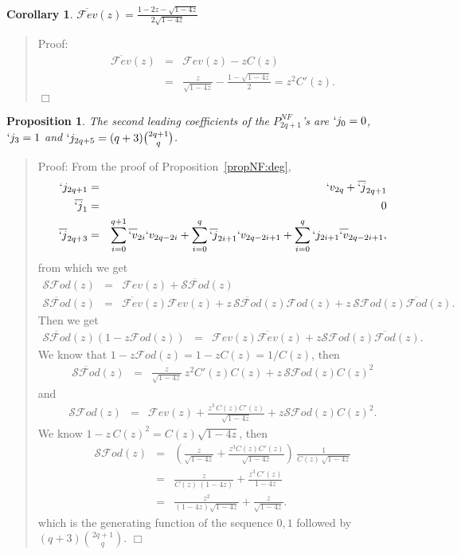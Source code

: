 \documentclass[preprint,authoryear]{elsarticle}
\newenvironment{proof}[1]{\begin{quotation}\noindent\textsf{Proof:} #1}{\(\Box\)\end{quotation}}
\newtheorem{prop}{Proposition}
\newtheorem{corollary}{Corollary}
\newcommand{\Fev}{\mathcal{F}ev}
\newcommand{\Fevb}{\overline{\mathcal{F}ev}}
\newcommand{\Fod}{\mathcal{F}od}
\newcommand{\Fodb}{\overline{\mathcal{F}od}}
\newcommand{\SFod}{\mathcal{SF}od}
\newcommand{\SFodb}{\overline{\mathcal{SF}od}}
\newcommand{\phib}[1]{\overline{`v}_{#1}}
\newcommand{\psib}[1]{\overline{`j}_{#1}}
\begin{document}
  \begin{corollary}
    $\Fevb(z) = \frac{1-2z - \sqrt{1-4z}}{2\sqrt{1-4z}}$
  \end{corollary}
  \begin{proof}{} 
    \begin{eqnarray*}
      \Fevb(z) &=& \Fev(z) - z C(z)\\
      &=& \frac{z}{\sqrt{1-4z}} - \frac{1-\sqrt{1-4z}}{2} =  z^2 C'(z).
    \end{eqnarray*}
  \end{proof}
 \begin{prop}
The second leading coefficients of  the $P^{NF}_{2q+1}$'s are $`j_0=0$, ${`j_3=1}$ and
$`j_{2q+5} = (q+3) {2q+1 \choose q}$.
\end{prop}
\begin{proof}{}
From the proof of Proposition~\ref{propNF:deg},
\begin{eqnarray*}
  `j_{2q+1} &=& `v_{2q} + \psib{2q+1}\\
  \psib{1}&=&0\\
\psib{2q+3} &=& \sum_{i=0}^{q+1} \phib{2i} `v_{2q-2i} + \sum_{i=0}^{q} \psib{2i+1}
`v_{2q-2i+1} + \sum_{i=0}^{q} `j_{2i+1} \phib{2q-2i+1},
\end{eqnarray*}
from which we get
\begin{eqnarray*}
  \SFod(z) &=& \Fev(z)+\SFodb(z)\\
\SFodb(z) &=& \Fevb(z)\Fev(z) + z\, \SFodb(z) \Fod(z) + z\, \SFod(z) \Fodb(z).
\end{eqnarray*}
Then we get
\begin{eqnarray*}
  \SFodb(z) (1-z\Fod(z))&=& \Fev(z) \Fevb(z) + z \SFod(z) \Fodb(z).
\end{eqnarray*}
We know that $1-z\Fod(z) = 1-zC(z) = 1/ C(z)$, then
\begin{eqnarray*}
  \SFodb(z) &=& \frac{z}{\sqrt{1-4z}}\ z^2C'(z) C(z) + z\, \SFod(z) C(z)^2
\end{eqnarray*}
and
\begin{eqnarray*}
  \SFod(z) &=& \Fev(z) + \frac{z^3\,C(z)C'(z)}{\sqrt{1-4z}} + z\SFod(z) C(z)^2.
\end{eqnarray*}
We know $1 - z\,C(z)^2 = C(z) \sqrt{1-4z}$, then
\begin{eqnarray*}
  \SFod(z) &=& \left(\frac{z}{\sqrt{1-4z}} + \frac{z^3C(z)C'(z)}{\sqrt{1-4z}}\right)\,
\frac{1}{C(z)\,\sqrt{1-4z}}\\
&=& \frac{z}{C(z)\,(1-4z)} + \frac{z^3\,C'(z)}{1-4z}\\
&=& \frac{z^2}{(1-4z)\sqrt{1-4z}} + \frac{z}{\sqrt{1-4z}}.
\end{eqnarray*}
which is the generating function of the sequence $0, 1$ followed by  $(q+3) {2q+1 \choose q}$.
\end{proof}
\end{document}
